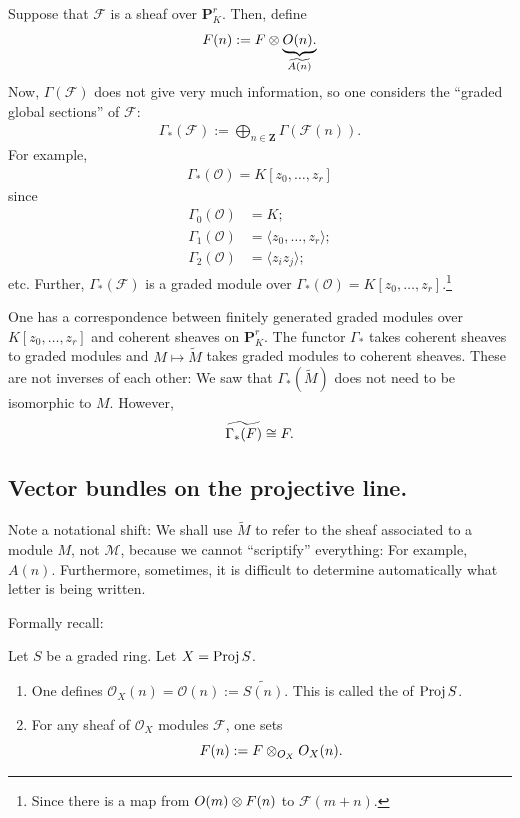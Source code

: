 \documentclass [11 pt, oneside] {article}
\begin{document}
Suppose that $\mathscr{F}$ is a sheaf over $\mathbf{P}^r_K$. Then, define 
\begin{align*}
	\relax{F}(n):=  \relax{F}\otimes \underbrace{\relax{O}(n).}_{\widetilde{A(n)}}
\end{align*}
Now, $\Gamma(\mathscr{F})$ does not give very much information, so one considers the ``graded global sections'' of $\mathscr{F}$:
\begin{align*}
	\Gamma_*(\mathscr{F}) := \bigoplus_{n\in\mathbf{Z}} \Gamma(\mathscr{F}(n)).
\end{align*}
For example,
\begin{align*}
	\Gamma_*(\mathscr{O}) = K[z_0,\hdots, z_r]
\end{align*}
since
\begin{align*}
	\Gamma_0(\mathscr{O}) &= K;\\
	\Gamma_1(\mathscr{O}) &= \langle z_0,\hdots, z_r\rangle;\\
	\Gamma_2(\mathscr{O}) &= \langle z_iz_j\rangle;
\end{align*}
etc.
Further, $\Gamma_*(\mathscr{F})$ is a graded module over $\Gamma_*(\mathscr{O}) = K[z_0,\hdots, z_r]$.\footnote{Since there is a map from $\relax{O}(m)\otimes  \relax{F}(n)$ to $\mathscr{F}(m+n)$.}

One has a correspondence between finitely generated graded modules over $K[z_0,\hdots,z_r]$ and coherent sheaves on $\mathbf{P}^r_K$. The functor $\Gamma_*$ takes coherent sheaves to graded modules and $M\longmapsto \tilde M$ takes graded modules to coherent sheaves. These are not inverses of each other: We saw that $\Gamma_*(\tilde M)$ does not need to be isomorphic to $M$. However, 
\begin{align*}
	\widetilde{\Gamma_*(\relax{F}) } \cong \relax{F}.
\end{align*}

\subsection{Vector bundles on the projective line.}
Note a notational shift: We shall use $\tilde M$ to refer to the sheaf associated to a module $M$, not $\mathscr M$, because we cannot ``scriptify'' everything: For example, $A(n)$. Furthermore, sometimes, it is difficult to determine automatically what letter is being written. 

Formally recall:

\begin{definition}
Let $S$ be a graded ring. Let $X=\operatorname{Proj} S$.
\begin{enumerate}
	\item One defines $\mathscr{O}_X(n)=\mathscr{O}(n) := \widetilde{S(n)}$. This is called the  of $\operatorname{Proj} S$.
	\item For any sheaf of $\mathscr{O}_X$ modules $\mathscr{F}$, one sets
	\[
		\relax{F}(n):= \relax{F} \otimes_{\relax{O}_X} \relax{O}_X(n).
	\]	
\end{enumerate}

\end{definition}
\end{document}
